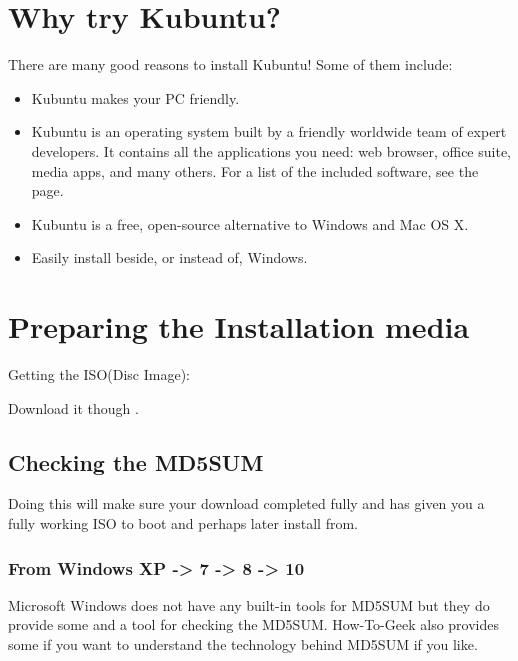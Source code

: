 \documentclass[letterpaper,10pt,english]{sphinxmanual}
\begin{document}
\section{Why try Kubuntu?}
\label{\detokenize{docs/installation:why-try-kubuntu}}
There are many good reasons to install Kubuntu!
Some of them include:
\begin{itemize}
\item {} 
Kubuntu makes your PC friendly.

\item {} 
Kubuntu is an operating system built by a friendly worldwide team of expert developers.
It contains all the applications you need: web browser, office suite, media apps, and many others. For a list of the included software, see the {\hyperref[\detokenize{docs/software:software-link}]{}} page.

\item {} 
Kubuntu is a free, open-source alternative to Windows and Mac OS X.

\item {} 
Easily install beside, or instead of, Windows.

\end{itemize}


\section{Preparing the Installation media}
\label{\detokenize{docs/installation:preparing-the-installation-media}}\label{\detokenize{docs/installation:get-kubuntu-link}}
Getting the ISO(Disc Image):

Download it though .


\subsection{Checking the MD5SUM}
\label{\detokenize{docs/installation:checking-the-md5sum}}\label{\detokenize{docs/installation:checksum-link}}
Doing this will make sure your download completed fully and has given you a fully working ISO to boot and perhaps later install from.


\subsubsection{From Windows XP -\textgreater{} 7 -\textgreater{} 8 -\textgreater{} 10}
\label{\detokenize{docs/installation:from-windows-xp-7-8-10}}
Microsoft Windows does not have any built-in tools for MD5SUM but they do
provide some  and a tool for checking the MD5SUM. How-To-Geek also provides some  if you want to understand the technology behind MD5SUM if you like.
\end{document}
